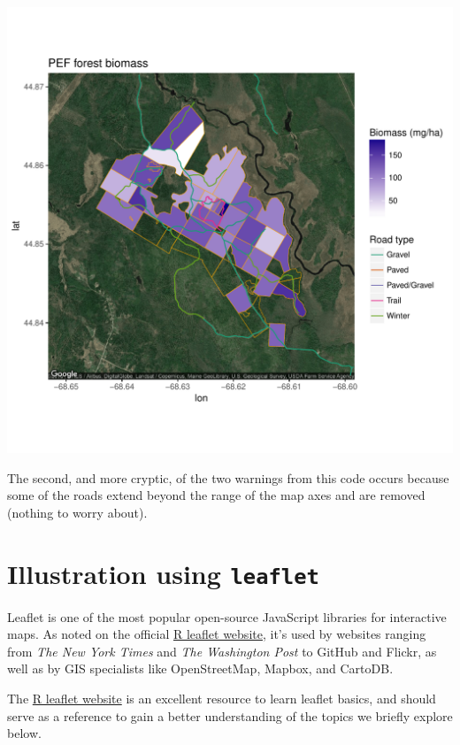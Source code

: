 \documentclass[12pt,oneside]{book}\usepackage[]{graphicx}\usepackage[]{color}
\makeatletter
\def\maxwidth{ %
  \ifdim\Gin@nat@width>\linewidth
    \linewidth
  \else
    \Gin@nat@width
  \fi
}
\newenvironment{kframe}{%
 \def\at@end@of@kframe{}%
 \ifinner\ifhmode%
  \def\at@end@of@kframe{\end{minipage}}%
  \begin{minipage}{\columnwidth}%
 \fi\fi%
 \def\FrameCommand##1{\hskip\@totalleftmargin \hskip-\fboxsep
 \colorbox{shadecolor}{##1}\hskip-\fboxsep
     \hskip-\linewidth \hskip-\@totalleftmargin \hskip\columnwidth}%
 \MakeFramed {\advance\hsize-\width
   \@totalleftmargin\z@ \linewidth\hsize
   \@setminipage}}%
 {\par\unskip\endMakeFramed%
 \at@end@of@kframe}
\newenvironment{knitrout}{}{} %
\makeatother
\begin{document}
\begin{knitrout}
\begin{kframe}
{\ttfamily\noindent\color{warningcolor}{Warning: Removed 149 rows containing missing values (geom\_path).}}\end{kframe}
\includegraphics[width=\maxwidth]{figure/unnamed-chunk-196-1} 

\end{knitrout}
The second, and more cryptic, of the two warnings from this code occurs because some of the roads extend beyond the range of the map axes and are removed (nothing to worry about).

\section{Illustration using \texttt{leaflet}}\label{sec:leaflet}

Leaflet is one of the most popular open-source JavaScript libraries for interactive maps. As noted on the official \href{https://rstudio.github.io/leaflet}{R leaflet website}, it's used by websites ranging from \emph{The New York Times} and \emph{The Washington Post} to GitHub and Flickr, as well as by GIS specialists like OpenStreetMap, Mapbox, and CartoDB.

The \href{https://rstudio.github.io/leaflet}{R leaflet website} is an excellent resource to learn leaflet basics, and should serve as a reference to gain a better understanding of the topics we briefly explore below.
\end{document}
